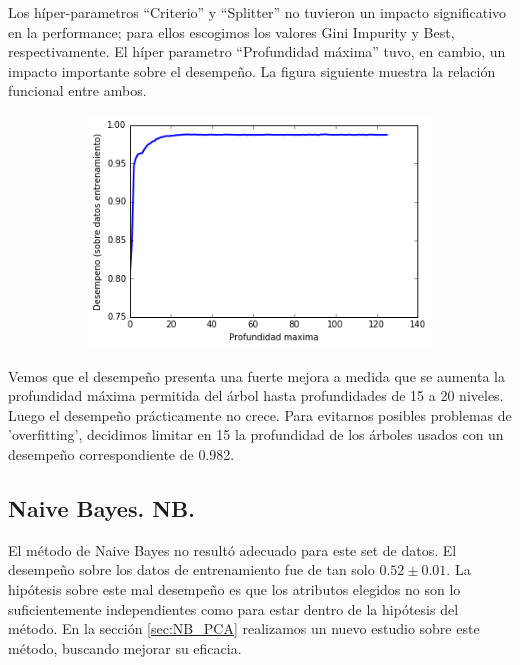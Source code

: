 \documentclass[a4paper,10pt]{article}
\begin{document}
Los híper-parametros ``Criterio'' y ``Splitter'' no tuvieron un impacto 
significativo en la performance; para ellos escogimos los valores Gini Impurity 
y Best, respectivamente.
El híper parametro ``Profundidad máxima'' tuvo, en cambio, un impacto 
importante sobre el desempeño. La figura siguiente muestra 
la relación funcional entre ambos.

  \begin{figure}[H]
    \centering
    \begin{subfigure}[b]{0.4\textwidth}
      \includegraphics[width=\textwidth]{../imagenes/desempeno-profundiad_arboles}
    \end{subfigure}
    \caption{}
    \label{fig:autovalores}
  \end{figure}


Vemos que el desempeño presenta una fuerte mejora a medida que se aumenta la profundidad máxima 
permitida del árbol hasta profundidades de 15 a 20 niveles. Luego el desempeño 
prácticamente no crece. Para evitarnos posibles problemas de 'overfitting', 
decidimos limitar en 15 la profundidad de los árboles usados con un desempeño 
correspondiente de 0.982.

\subsection{Naive Bayes. NB.}\label{sec:NB}

El m\'etodo de Naive Bayes no result\'o adecuado para este set de datos. El desempeño sobre los datos de entrenamiento fue de tan solo $0.52 \pm 0.01$. 
La hipótesis sobre este mal desempeño es que los atributos elegidos no son lo
suficientemente independientes como para estar dentro de la hipótesis del
método. En la sección \ref{sec:NB_PCA} realizamos un nuevo estudio 
sobre este método, buscando mejorar su eficacia.
\end{document}
